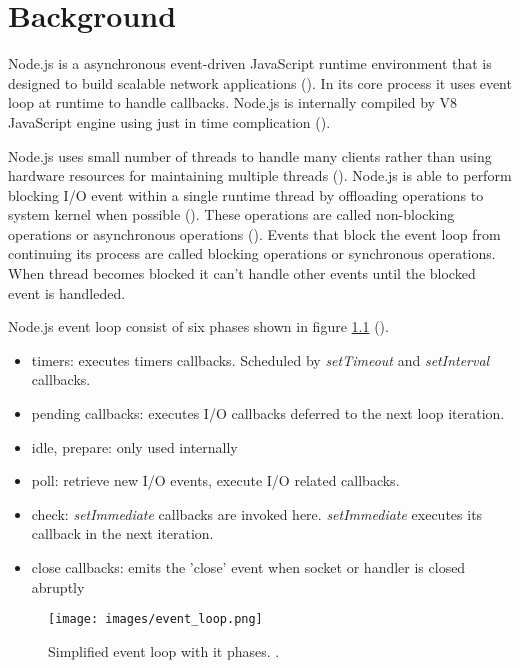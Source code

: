 \chapter{Background\label{background}}
Node.js is a asynchronous event-driven JavaScript runtime environment that is designed to build scalable network applications (\cite{node.jsAbout}).
In its core process it uses event loop at runtime to handle callbacks.
Node.js is internally compiled by V8 JavaScript engine using just in time complication (\cite{nodejsTheV8}).

Node.js uses small number of threads to handle many clients rather than using hardware resources for maintaining multiple threads (\cite{node.jsOverviewBlockVsNonBlock}).
Node.js is able to perform blocking I/O event within a single runtime thread by offloading operations to system kernel when possible (\cite{node.jsEventLoop}).
These operations are called non-blocking operations or asynchronous operations (\cite{node.jsOverviewBlockVsNonBlock}).
Events that block the event loop from continuing its process are called blocking operations or synchronous operations.
When thread becomes blocked it can't handle other events until the blocked event is handleded.

Node.js event loop consist of six phases shown in figure \ref{figure:nodejs:eventloop} (\cite{node.jsEventLoop}).
\begin{itemize}
    \item
    timers: executes timers callbacks. Scheduled by \textit{setTimeout} and \textit{setInterval} callbacks.
    \item
    pending callbacks: executes I/O callbacks deferred to the next loop iteration.
    \item
    idle, prepare: only used internally
    \item
    poll: retrieve new I/O events, execute I/O related callbacks.
    \item
    check: \textit{setImmediate} callbacks are invoked here. \textit{setImmediate} executes its callback in the next iteration.
    \item
    close callbacks: emits the 'close' event when socket or handler is closed abruptly
\end{itemize}

\begin{figure}[htbp]
    \texttt{[image: images/event\_loop.png]}
    \caption{Simplified event loop with it phases. \cite{node.jsEventLoop}.}
    \label{figure:nodejs:eventloop}
\end{figure}

